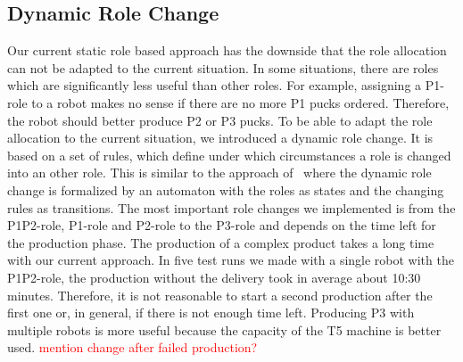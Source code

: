 \subsection{Dynamic Role Change}
Our current static role based approach has the downside that the role allocation can not be adapted to the current situation. In some situations, there are roles which are significantly less useful than other roles. For example, assigning a P1-role to a robot makes no sense if there are no more P1 pucks ordered. Therefore, the robot should better produce P2 or P3 pucks. To be able to adapt the role allocation to the current situation, we introduced a dynamic role change. It is based on a set of rules, which define under which circumstances a role is changed into an other role. This is similar to the approach of~\cite{dynamic_role_assignment} where the dynamic role change is formalized by an automaton with the roles as states and the changing rules as transitions. The most important role changes we implemented is from the P1P2-role, P1-role and P2-role to the P3-role and depends on the time left for the production phase. The production of a complex product takes a long time with our current approach. In five test runs we made with a single robot with the P1P2-role, the production without the delivery took in average about 10:30 minutes. Therefore, it is not reasonable to start a second production after the first one or, in general, if there is not enough time left. Producing P3 with multiple robots is more useful because the capacity of the T5 machine is better used.
\textcolor{red}{mention change after failed production?}
